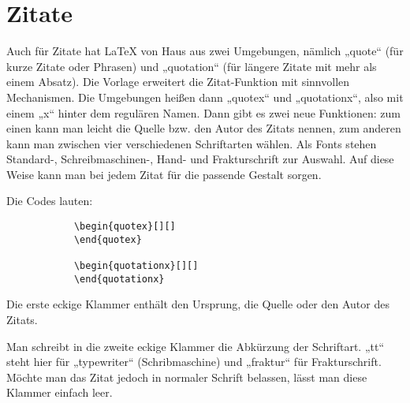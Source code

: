 			\newline

		\section{Zitate}

			Auch für Zitate hat \LaTeX{} von Haus aus zwei Umgebungen, nämlich „quote“ (für kurze Zitate oder Phrasen) und „quotation“ (für längere Zitate mit mehr als einem Absatz). Die Vorlage erweitert die Zitat-Funktion mit sinnvollen Mechanismen. Die Umgebungen heißen dann „quotex“ und „quotationx“, also mit einem „x“ hinter dem regulären Namen. Dann gibt es zwei neue Funktionen: zum einen kann man leicht die Quelle bzw. den Autor des Zitats nennen, zum anderen kann man zwischen vier verschiedenen Schriftarten wählen. Als Fonts stehen Standard-, Schreibmaschinen-, Hand- und Frakturschrift zur Auswahl. Auf diese Weise kann man bei jedem Zitat für die passende Gestalt sorgen.

			Die Codes lauten:

			\begin{verbatim}
			\begin{quotex}[][]
			\end{quotex}

			\begin{quotationx}[][]
			\end{quotationx}
			\end{verbatim}\newline

			Die erste eckige Klammer enthält den Ursprung, die Quelle oder den Autor des Zitats.

			Man schreibt in die zweite eckige Klammer die Abkürzung der Schriftart. „tt“ steht hier für „typewriter“ (Schribmaschine) und „fraktur“ für Frakturschrift. Möchte man das Zitat jedoch in normaler Schrift belassen, lässt man diese Klammer einfach leer.

